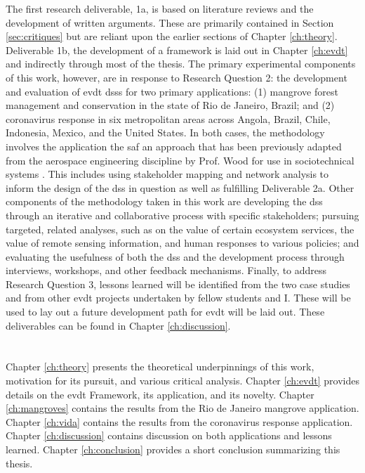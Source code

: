 The first research deliverable, 1a, is based on literature reviews and the development of written arguments. These are primarily contained in Section \ref{sec:critiques} but are reliant upon the earlier sections of Chapter \ref{ch:theory}. Deliverable 1b, the development of a framework is laid out in Chapter \ref{ch:evdt} and indirectly through most of the thesis. The primary experimental components of this work, however, are in response to Research Question 2: the development and evaluation of \ac{evdt} \acp{dss} for two primary applications: (1) mangrove forest management and conservation in the state of Rio de Janeiro, Brazil; and (2) coronavirus response in six metropolitan areas across Angola, Brazil, Chile, Indonesia, Mexico, and the United States. In both cases, the methodology involves the application the \ac{saf} \cite{maierArtSystemsArchitecting2009, crawleySystemArchitectureStrategy2015} an approach that has been previously adapted from the aerospace engineering discipline by Prof. Wood for use in sociotechnical systems \cite{pfotenhauerArchitectingComplexInternational2016}. This includes using stakeholder mapping and network analysis to inform the design of the \ac{dss} in question as well as fulfilling Deliverable 2a. Other components of the methodology taken in this work are developing the \ac{dss} through an iterative and collaborative process with specific stakeholders; pursuing targeted, related analyses, such as on the value of certain ecosystem services, the value of remote sensing information, and human responses to various policies; and evaluating the usefulness of both the \ac{dss} and the development process through interviews, workshops, and other feedback mechanisms. Finally, to address Research Question 3, lessons learned will be identified from the two case studies and from other \ac{evdt} projects undertaken by fellow students and I. These will be used to lay out a future development path for \ac{evdt} will be laid out. These deliverables can be found in Chapter \ref{ch:discussion}.

\section{}

Chapter \ref{ch:theory} presents the theoretical underpinnings of this work, motivation for its pursuit, and various critical analysis. Chapter \ref{ch:evdt} provides details on the \ac{evdt} Framework, its application, and its novelty. Chapter \ref{ch:mangroves} contains the results from the Rio de Janeiro mangrove application. Chapter \ref{ch:vida} contains the results from the coronavirus response application. Chapter \ref{ch:discussion} contains discussion on both applications and lessons learned. Chapter \ref{ch:conclusion} provides a short conclusion summarizing this thesis.